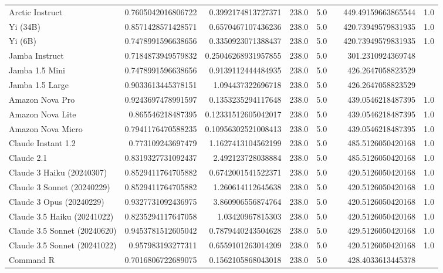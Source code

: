 \begin{table}[htp]
{\begin{tabular}{lrrrrrrr}
Arctic Instruct & 0.7605042016806722 & 0.3992174813727371 & 238.0 & 5.0 &  & 449.49159663865544 & 1.0 \\
Yi (34B) & 0.8571428571428571 & 0.6570467107436236 & 238.0 & 5.0 &  & 420.73949579831935 & 1.0 \\
Yi (6B) & 0.7478991596638656 & 0.3350923071388437 & 238.0 & 5.0 &  & 420.73949579831935 & 1.0 \\
Jamba Instruct & 0.7184873949579832 & 0.25046268931957855 & 238.0 & 5.0 &  & 301.2310924369748 &  \\
Jamba 1.5 Mini & 0.7478991596638656 & 0.9139112444484935 & 238.0 & 5.0 &  & 426.2647058823529 &  \\
Jamba 1.5 Large & 0.9033613445378151 & 1.094437322696718 & 238.0 & 5.0 &  & 426.2647058823529 &  \\
Amazon Nova Pro & 0.9243697478991597 & 0.1353235294117648 & 238.0 & 5.0 &  & 439.0546218487395 & 1.0 \\
Amazon Nova Lite & 0.865546218487395 & 0.12331512605042017 & 238.0 & 5.0 &  & 439.0546218487395 & 1.0 \\
Amazon Nova Micro & 0.7941176470588235 & 0.10956302521008413 & 238.0 & 5.0 &  & 439.0546218487395 & 1.0 \\
Claude Instant 1.2 & 0.773109243697479 & 1.1627413104562199 & 238.0 & 5.0 &  & 485.5126050420168 & 1.0 \\
Claude 2.1 & 0.8319327731092437 & 2.492123728038884 & 238.0 & 5.0 &  & 485.5126050420168 & 1.0 \\
Claude 3 Haiku (20240307) & 0.8529411764705882 & 0.6742001541522371 & 238.0 & 5.0 &  & 420.5126050420168 & 1.0 \\
Claude 3 Sonnet (20240229) & 0.8529411764705882 & 1.260614112645638 & 238.0 & 5.0 &  & 420.5126050420168 & 1.0 \\
Claude 3 Opus (20240229) & 0.9327731092436975 & 3.860906556874764 & 238.0 & 5.0 &  & 420.5126050420168 & 1.0 \\
Claude 3.5 Haiku (20241022) & 0.8235294117647058 & 1.03420967815303 & 238.0 & 5.0 &  & 420.5126050420168 & 1.0 \\
Claude 3.5 Sonnet (20240620) & 0.9453781512605042 & 0.7879440243504628 & 238.0 & 5.0 &  & 429.5126050420168 & 1.0 \\
Claude 3.5 Sonnet (20241022) & 0.957983193277311 & 0.6559101263014209 & 238.0 & 5.0 &  & 420.5126050420168 & 1.0 \\
Command R & 0.7016806722689075 & 0.1562105868043018 & 238.0 & 5.0 &  & 428.4033613445378 &  \\

\end{tabular}}
\end{table}
